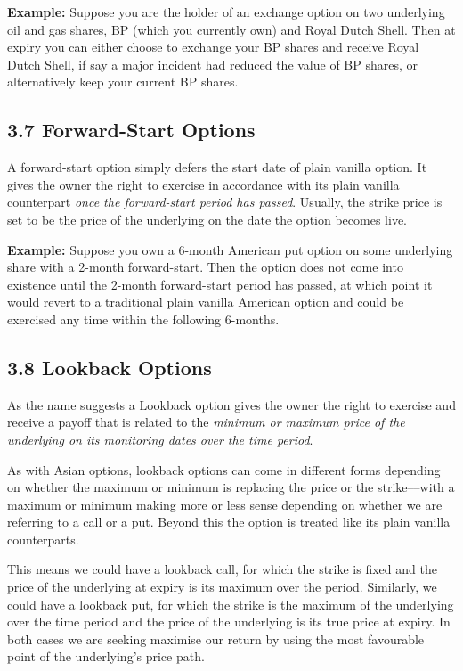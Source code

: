 \documentclass[11pt]{article}
\begin{document}
\textbf{Example:} Suppose you are the holder of an exchange option on two underlying oil and gas shares, BP (which you currently own) and Royal Dutch Shell. Then at expiry you can either choose to exchange your BP shares and receive Royal Dutch Shell, if say a major incident had reduced the value of BP shares, or alternatively keep your current BP shares. 

\subsection*{3.7 Forward-Start Options}
A forward-start option simply defers the start date of plain vanilla option. It gives the owner the right to exercise in accordance with its plain vanilla counterpart \textit{once the forward-start period has passed}. Usually, the strike price is set to be the price of the underlying on the date the option becomes live. 

\textbf{Example:} Suppose you own a 6-month American put option on some underlying share with a 2-month forward-start. Then the option does not come into existence until the 2-month forward-start period has passed, at which point it would revert to a traditional plain vanilla American option and could be exercised any time within the following 6-months.

\subsection*{3.8 Lookback Options}
As the name suggests a Lookback option gives the owner the right to exercise and receive a payoff that is related to the \textit{minimum or maximum price of the underlying on its monitoring dates over the time period}. 

As with Asian options, lookback options can come in different forms depending on whether the maximum or minimum is replacing the price or the strike––with a maximum or minimum making more or less sense depending on whether we are referring to a call or a put. Beyond this the option is treated like its plain vanilla counterparts.

This means we could have a lookback call, for which the strike is fixed and the price of the underlying at expiry is its maximum over the period. Similarly, we could have a lookback put, for which the strike is the maximum of the underlying over the time period and the price of the underlying is its true price at expiry. In both cases we are seeking maximise our return by using the most favourable point of the underlying's price path. 
\end{document}
